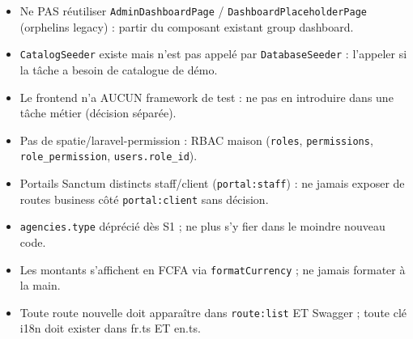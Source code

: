 \documentclass[11pt,a4paper]{article}
\begin{document}
\begin{itemize}[nosep]
  \item Ne PAS réutiliser \verb|AdminDashboardPage| / \verb|DashboardPlaceholderPage| (orphelins legacy) : partir du composant existant group dashboard.
  \item \verb|CatalogSeeder| existe mais n'est pas appelé par \verb|DatabaseSeeder| : l'appeler si la tâche a besoin de catalogue de démo.
  \item Le frontend n'a AUCUN framework de test : ne pas en introduire dans une tâche métier (décision séparée).
  \item Pas de spatie/laravel-permission : RBAC maison (\verb|roles|, \verb|permissions|, \verb|role_permission|, \verb|users.role_id|).
  \item Portails Sanctum distincts staff/client (\verb|portal:staff|) : ne jamais exposer de routes business côté \verb|portal:client| sans décision.
  \item \verb|agencies.type| déprécié dès S1 ; ne plus s'y fier dans le moindre nouveau code.
  \item Les montants s'affichent en FCFA via \verb|formatCurrency| ; ne jamais formater à la main.
  \item Toute route nouvelle doit apparaître dans \verb|route:list| ET Swagger ; toute clé i18n doit exister dans fr.ts ET en.ts.
\end{itemize}
\end{document}

